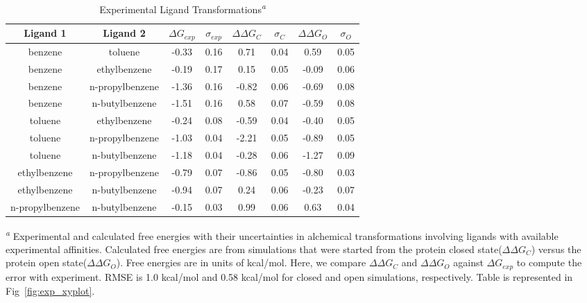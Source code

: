 \begin{table}[!htb]
\centering
\caption{Experimental Ligand Transformations\textsuperscript{\emph{a}}}
\label{tbl:exp_set}
\begin{tabular}{|c|c|c|c|c|c|c|c|}
\hline
\textbf{Ligand 1} & \textbf{Ligand 2}  & \boldmath$\Delta G_{exp}$  & \boldmath$\sigma_{exp}$ & \boldmath$\Delta\Delta G_{C}$ & \boldmath$\sigma_{C}$ & \boldmath$\Delta\Delta G_{O}$ & \boldmath$\sigma_{O}$ \\ \hline
benzene         & toluene         & -0.33        & 0.16            & 0.71       & 0.04          & 0.59       & 0.05          \\ \hline
benzene         & ethylbenzene    & -0.19        & 0.17            & 0.15       & 0.05          & -0.09      & 0.06          \\ \hline
benzene         & n-propylbenzene & -1.36        & 0.16            & -0.82      & 0.06          & -0.69      & 0.08          \\ \hline
benzene         & n-butylbenzene  & -1.51        & 0.16            & 0.58       & 0.07          & -0.59      & 0.08          \\ \hline
toluene         & ethylbenzene    & -0.24        & 0.08            & -0.59      & 0.04          & -0.40      & 0.05          \\ \hline
toluene         & n-propylbenzene & -1.03        & 0.04            & -2.21      & 0.05          & -0.89      & 0.05          \\ \hline
toluene         & n-butylbenzene  & -1.18        & 0.04            & -0.28      & 0.06          & -1.27       & 0.09         \\ \hline
ethylbenzene    & n-propylbenzene & -0.79        & 0.07            & -0.86      & 0.05          & -0.80       & 0.03         \\ \hline
ethylbenzene    & n-butylbenzene  & -0.94        & 0.07            & 0.24       & 0.06          & -0.23      & 0.07          \\ \hline
n-propylbenzene & n-butylbenzene  & -0.15        & 0.03            & 0.99       & 0.06          & 0.63       & 0.04          \\ \hline
\end{tabular}

\textsuperscript{\emph{a}} Experimental and calculated free energies with their uncertainties in alchemical transformations involving ligands with available experimental affinities.
Calculated free energies are from simulations that were started from the protein closed state(\boldmath$\Delta\Delta G_{C}$) versus the protein open state(\boldmath$\Delta\Delta G_{O}$). 
Free energies are in units of kcal/mol.
Here, we compare \boldmath$\Delta\Delta G_{C}$ and \boldmath$\Delta\Delta G_{O}$ against \boldmath$\Delta G_{exp}$ to compute the error with experiment.
RMSE is 1.0 kcal/mol and 0.58 kcal/mol for closed and open simulations, respectively.
Table is represented in Fig~\ref{fig:exp_xyplot}.
\end{table}

